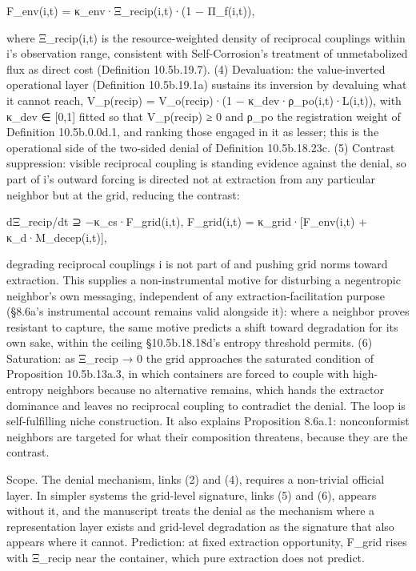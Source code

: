 \documentclass[
]{article}
\begin{document}
F\_env(i,t) = κ\_env·Ξ\_recip(i,t)·(1 − Π\_f(i,t)),

where Ξ\_recip(i,t) is the resource-weighted density of reciprocal
couplings within i's observation range, consistent with Self-Corrosion's
treatment of unmetabolized flux as direct cost (Definition 10.5b.19.7).
(4) Devaluation: the value-inverted operational layer (Definition
10.5b.19.1a) sustains its inversion by devaluing what it cannot reach,
V\_p(recip) = V\_o(recip)·(1 − κ\_dev·ρ\_po(i,t)·L(i,t)), with κ\_dev ∈
{[}0,1{]} fitted so that V\_p(recip) ≥ 0 and ρ\_po the registration
weight of Definition 10.5b.0.0d.1, and ranking those engaged in it as
lesser; this is the operational side of the two-sided denial of
Definition 10.5b.18.23c. (5) Contrast suppression: visible reciprocal
coupling is standing evidence against the denial, so part of i's outward
forcing is directed not at extraction from any particular neighbor but
at the grid, reducing the contrast:

dΞ\_recip/dt ⊇ −κ\_cs·F\_grid(i,t), F\_grid(i,t) =
κ\_grid·{[}F\_env(i,t) + κ\_d·M\_decep(i,t){]},

degrading reciprocal couplings i is not part of and pushing grid norms
toward extraction. This supplies a non-instrumental motive for
disturbing a negentropic neighbor's own messaging, independent of any
extraction-facilitation purpose (§8.6a's instrumental account remains
valid alongside it): where a neighbor proves resistant to capture, the
same motive predicts a shift toward degradation for its own sake, within
the ceiling §10.5b.18.18d's entropy threshold permits. (6) Saturation:
as Ξ\_recip → 0 the grid approaches the saturated condition of
Proposition 10.5b.13a.3, in which containers are forced to couple with
high-entropy neighbors because no alternative remains, which hands the
extractor dominance and leaves no reciprocal coupling to contradict the
denial. The loop is self-fulfilling niche construction. It also explains
Proposition 8.6a.1: nonconformist neighbors are targeted for what their
composition threatens, because they are the contrast.

Scope. The denial mechanism, links (2) and (4), requires a non-trivial
official layer. In simpler systems the grid-level signature, links (5)
and (6), appears without it, and the manuscript treats the denial as the
mechanism where a representation layer exists and grid-level degradation
as the signature that also appears where it cannot. Prediction: at fixed
extraction opportunity, F\_grid rises with Ξ\_recip near the container,
which pure extraction does not predict.
\end{document}
